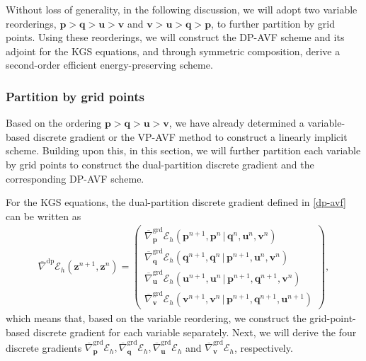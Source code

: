 \documentclass[fleqn,11pt]{elsarticle}
\numberwithin{equation}{section}
\begin{document}
Without loss of generality, in the following discussion, we will adopt two variable reorderings, $\bm{p} > \bm{q} > \bm{u} > \bm{v}$ and $\bm{v} > \bm{u} > \bm{q} > \bm{p}$, to further partition by grid points. Using these reorderings, we will construct the DP-AVF scheme and its adjoint for the KGS equations, and through symmetric composition, derive a second-order efficient energy-preserving scheme.



\subsubsection{Partition by grid points}

Based on the ordering $\bm{p} > \bm{q} > \bm{u} > \bm{v}$, we have already determined a variable-based discrete gradient or the VP-AVF method to construct a linearly implicit scheme. Building upon this, in this section, we will further partition each variable by grid points to construct the dual-partition discrete gradient and the corresponding DP-AVF scheme.


For the KGS equations, the dual-partition discrete gradient defined in \eqref{dp-avf} can be written as
\begin{equation}\label{dp-kgs}
	\begin{aligned}
		\overline{\nabla}^{\text{dp}}\mathcal{E}_h(\bm z^{n+1},\bm z^n)=\left(\begin{array}{l}
		\overline{\nabla}^{\text{grd}}_{\bm p}\mathcal{E}_h(\bm p^{n+1},\bm p^{n}\,\big|\, \bm q^n,\bm u^n,\bm v^n)         \\[1ex]
		\overline{\nabla}^{\text{grd}}_{\bm q}\mathcal{E}_h(\bm q^{n+1},\bm q^{n}\,\big|\, \bm p^{n+1},\bm u^n,\bm v^n)     \\[1ex]
		\overline{\nabla}^{\text{grd}}_{\bm u}\mathcal{E}_h(\bm u^{n+1},\bm u^{n}\,\big|\, \bm p^{n+1},\bm q^{n+1},\bm v^n) \\[1ex]
		\overline{\nabla}^{\text{grd}}_{\bm v}\mathcal{E}_h(\bm v^{n+1},\bm v^{n}\,\big|\, \bm p^{n+1},\bm q^{n+1},\bm u^{n+1})
		\end{array}\right),
	\end{aligned}
\end{equation}
which means that, based on the variable reordering, we construct the grid-point-based discrete gradient for each variable separately. Next, we will derive the four discrete gradients $\overline{\nabla}^{\text{grd}}_{\bm p}\mathcal{E}_h, \overline{\nabla}^{\text{grd}}_{\bm q}\mathcal{E}_h, \overline{\nabla}^{\text{grd}}_{\bm u}\mathcal{E}_h$ and $ \overline{\nabla}^{\text{grd}}_{\bm v}\mathcal{E}_h$, respectively.
\end{document}
